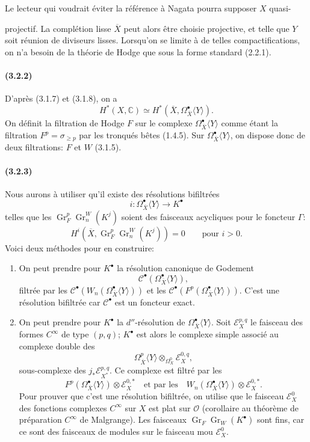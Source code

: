 \documentclass[10pt]{article}
\newcommand{\C}{\mathbb C}
\newcommand{\Gr}{\operatorname{Gr}}
\begin{document}
Le lecteur qui voudrait éviter la référence à Nagata pourra supposer $X$ quasi-



projectif. La complétion lisse $\overline X$ peut alors être choisie projective, et telle que $Y$ soit réunion de diviseurs lisses. Lorsqu'on se limite à de telles compactifications, on n'a besoin de la théorie de Hodge que sous la forme standard (2.2.1).

\paragraph{(3.2.2)} D'après (3.1.7) et (3.1.8), on a
\[
H^*(X,\C)\simeq H^*(\overline X,\Omega_{\overline X}^{\bullet}\langle Y\rangle).
\]
On définit la filtration de Hodge $F$ sur le complexe $\Omega_{\overline X}^{\bullet}\langle Y\rangle$ comme étant la filtration $F^p=\sigma_{\ge p}$ par les tronqués bêtes (1.4.5). Sur $\Omega_{\overline X}^{\bullet}\langle Y\rangle$, on dispose donc de deux filtrations: $F$ et $W$ (3.1.5).

\paragraph{(3.2.3)} Nous aurons à utiliser qu'il existe des résolutions bifiltrées
\[
i:\Omega_{\overline X}^{\bullet}\langle Y\rangle\longrightarrow K^\bullet
\]
telles que les $\Gr_F^p\Gr_n^W(K^j)$ soient des faisceaux acycliques pour le foncteur $\Gamma$:
\[
H^i(\overline X,\Gr_F^p\Gr_n^W(K^j))=0\qquad \text{pour }i>0.
\]
Voici deux méthodes pour en construire:
\begin{enumerate}[label=\alph*)]
\item On peut prendre pour $K^\bullet$ la résolution canonique de Godement
\[
\mathcal C^\bullet(\Omega_{\overline X}^{\bullet}\langle Y\rangle),
\]
filtrée par les $\mathcal C^\bullet(W_n(\Omega_{\overline X}^{\bullet}\langle Y\rangle))$ et les
$\mathcal C^\bullet(F^p(\Omega_{\overline X}^{\bullet}\langle Y\rangle))$. C'est une résolution bifiltrée car $\mathcal C^\bullet$ est un foncteur exact.
\item On peut prendre pour $K^\bullet$ la $d''$-résolution de $\Omega_{\overline X}^{\bullet}\langle Y\rangle$. Soit $\mathcal E_X^{p,q}$ le faisceau des formes $C^\infty$ de type $(p,q)$; $K^\bullet$ est alors le complexe simple associé au complexe double des
\[
\Omega_{\overline X}^{p}\langle Y\rangle\otimes_{\Omega_X^0}\mathcal E_X^{0,q},
\]
sous-complexe des $j_*\mathcal E_{X^*}^{p,q}$. Ce complexe est filtré par les
\[
F^p(\Omega_{\overline X}^{\bullet}\langle Y\rangle)\otimes\mathcal E_X^{0,*}
\quad\text{et par les}\quad
W_n(\Omega_{\overline X}^{\bullet}\langle Y\rangle)\otimes\mathcal E_X^{0,*}.
\]
Pour prouver que c'est une résolution bifiltrée, on utilise que le faisceau $\mathcal E_X^0$ des fonctions complexes $C^\infty$ sur $X$ est plat sur $\mathcal O$ (corollaire au théorème de préparation $C^\infty$ de Malgrange). Les faisceaux $\Gr_F\Gr_W(K^\bullet)$ sont fins, car ce sont des faisceaux de modules sur le faisceau mou $\mathcal E_X^0$.
\end{enumerate}
\end{document}
